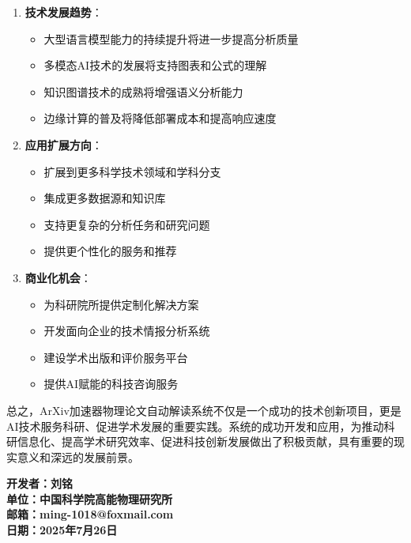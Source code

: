 \documentclass[12pt,a4paper]{article}
\begin{document}
\begin{enumerate}
    \item \textbf{技术发展趋势}：
        \begin{itemize}
            \item 大型语言模型能力的持续提升将进一步提高分析质量
            \item 多模态AI技术的发展将支持图表和公式的理解
            \item 知识图谱技术的成熟将增强语义分析能力
            \item 边缘计算的普及将降低部署成本和提高响应速度
        \end{itemize}
    
    \item \textbf{应用扩展方向}：
        \begin{itemize}
            \item 扩展到更多科学技术领域和学科分支
            \item 集成更多数据源和知识库
            \item 支持更复杂的分析任务和研究问题
            \item 提供更个性化的服务和推荐
        \end{itemize}
    
    \item \textbf{商业化机会}：
        \begin{itemize}
            \item 为科研院所提供定制化解决方案
            \item 开发面向企业的技术情报分析系统
            \item 建设学术出版和评价服务平台
            \item 提供AI赋能的科技咨询服务
        \end{itemize}
\end{enumerate}

总之，ArXiv加速器物理论文自动解读系统不仅是一个成功的技术创新项目，更是AI技术服务科研、促进学术发展的重要实践。系统的成功开发和应用，为推动科研信息化、提高学术研究效率、促进科技创新发展做出了积极贡献，具有重要的现实意义和深远的发展前景。

\vspace{2cm}

\begin{center}
\textbf{开发者：刘铭}\\
\textbf{单位：中国科学院高能物理研究所}\\
\textbf{邮箱：ming-1018@foxmail.com}\\
\textbf{日期：2025年7月26日}
\end{center}
\end{document}

